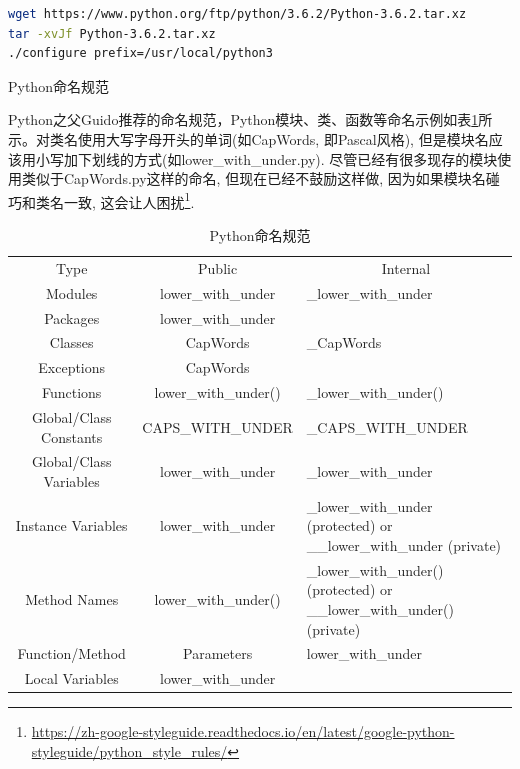 \documentclass[8pt]{book}
\makeatletter
\numberwithin{dummy}{section}
\theoremstyle{ocrenumbox}
\theoremstyle{blacknumex}
\theoremstyle{blacknumbox}
\theoremstyle{ocrenum}
\renewcommand{\subsection}{\@startsection {subsection}{2}{\z@}
	{-3ex \@plus -0.1ex \@minus -.4ex}
	{0.5ex \@plus.2ex }
	{\normalfont\sffamily\bfseries}}
\makeatother
\begin{document}
\begin{lstlisting}[language=Bash]
wget https://www.python.org/ftp/python/3.6.2/Python-3.6.2.tar.xz
tar -xvJf Python-3.6.2.tar.xz
./configure prefix=/usr/local/python3
\end{lstlisting}

\subsection{Python命名规范}

Python之父Guido推荐的命名规范，Python模块、类、函数等命名示例如表\ref{table:pythonnamingspecification}所示。对类名使用大写字母开头的单词(如CapWords, 即Pascal风格), 但是模块名应该用小写加下划线的方式(如lower\_with\_under.py). 尽管已经有很多现存的模块使用类似于CapWords.py这样的命名, 但现在已经不鼓励这样做, 因为如果模块名碰巧和类名一致, 这会让人困扰\footnote{\url{https://zh-google-styleguide.readthedocs.io/en/latest/google-python-styleguide/python_style_rules/}}.


\begin{table}[htbp]
	\caption{Python命名规范}
	\label{table:pythonnamingspecification}
	\begin{center}
		\begin{tabular}{|c|c|p{5cm}|}
			\hline
			\multirow{1}{*}{Type}
			& \multicolumn{1}{c|}{Public} 
			& \multicolumn{1}{c|}{Internal}\\			
			\cline{1-3}
			Modules &  lower\_with\_under	  & \_lower\_with\_under \\
			\hline
			Packages & lower\_with\_under &   \\
			\hline
			Classes & CapWords & \_CapWords \\
			\hline
			Exceptions & CapWords & \\
			\hline
			Functions &	lower\_with\_under() &	\_lower\_with\_under()\\
			\hline 
			Global/Class Constants &	CAPS\_WITH\_UNDER &\_CAPS\_WITH\_UNDER\\
			\hline
			Global/Class Variables &	lower\_with\_under &	\_lower\_with\_under\\
			\hline
			Instance Variables &	lower\_with\_under &	\_lower\_with\_under (protected) or \_\_lower\_with\_under (private)\\
			\hline
			Method Names &	lower\_with\_under() &	\_lower\_with\_under() (protected) or \_\_lower\_with\_under() (private)\\
			\hline
			Function/Method & Parameters &	lower\_with\_under\\
			\hline	 
			Local Variables &	lower\_with\_under	& \\
			\hline							
		\end{tabular}	
	\end{center}
\end{table}
\end{document}
